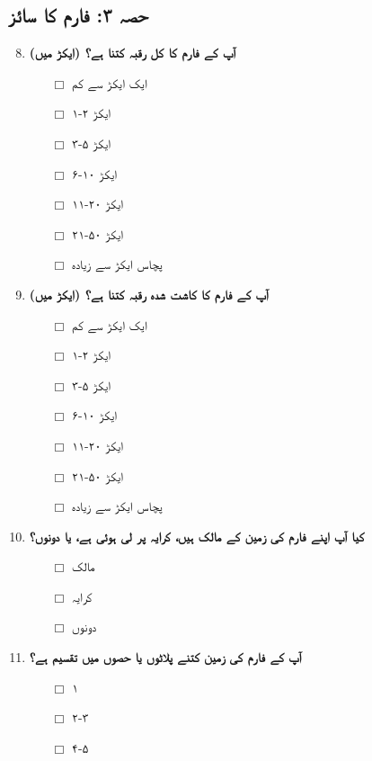 \documentclass[12pt]{article}
\begin{document}
\begin{urdu}
\section*{حصہ ۳: فارم کا سائز}

\begin{enumerate}[label=\arabic*.]
    \setcounter{enumi}{7}
    \item \textbf{آپ کے فارم کا کل رقبہ کتنا ہے؟ (ایکڑ میں)}
    \begin{itemize}
        \item [$\Box$] ایک ایکڑ سے کم
        \item [$\Box$] ۱-۲ ایکڑ
        \item [$\Box$] ۳-۵ ایکڑ
        \item [$\Box$] ۶-۱۰ ایکڑ
        \item [$\Box$] ۱۱-۲۰ ایکڑ
        \item [$\Box$] ۲۱-۵۰ ایکڑ
        \item [$\Box$] پچاس ایکڑ سے زیادہ
    \end{itemize}
    \item \textbf{آپ کے فارم کا کاشت شدہ رقبہ کتنا ہے؟ (ایکڑ میں)}
    \begin{itemize}
        \item [$\Box$] ایک ایکڑ سے کم
        \item [$\Box$] ۱-۲ ایکڑ
        \item [$\Box$] ۳-۵ ایکڑ
        \item [$\Box$] ۶-۱۰ ایکڑ
        \item [$\Box$] ۱۱-۲۰ ایکڑ
        \item [$\Box$] ۲۱-۵۰ ایکڑ
        \item [$\Box$] پچاس ایکڑ سے زیادہ
    \end{itemize}
    \item \textbf{کیا آپ اپنے فارم کی زمین کے مالک ہیں، کرایہ پر لی ہوئی ہے، یا دونوں؟}
    \begin{itemize}
        \item [$\Box$] مالک
        \item [$\Box$] کرایہ
        \item [$\Box$] دونوں
    \end{itemize}
    \item \textbf{آپ کے فارم کی زمین کتنے پلاٹوں یا حصوں میں تقسیم ہے؟}
    \begin{itemize}
        \item [$\Box$] ۱
        \item [$\Box$] ۲-۳
        \item [$\Box$] ۴-۵

\end{itemize}
\end{enumerate}
\end{urdu}
\end{document}
